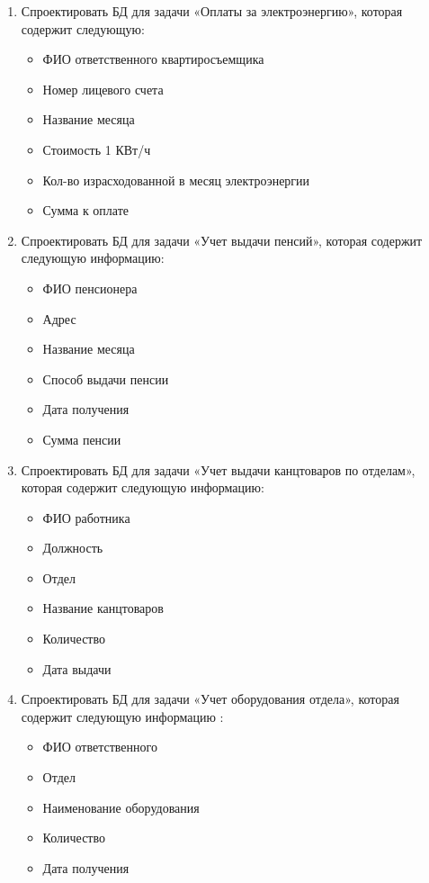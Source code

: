\documentclass[a4paper]{article}
\begin{document}
\begin{enumerate}
  \item Спроектировать БД для задачи «Оплаты за электроэнергию», которая содержит следующую:
    \begin{itemize}
      \item ФИО ответственного квартиросъемщика
      \item Номер лицевого счета
      \item Название месяца
      \item Стоимость 1 КВт/ч
      \item Кол-во израсходованной в месяц электроэнергии
      \item Сумма к оплате
    \end{itemize}


  \item Спроектировать БД для задачи «Учет выдачи пенсий», которая содержит следующую информацию:
    \begin{itemize}
        \item ФИО пенсионера
        \item Адрес
        \item Название месяца
        \item Способ выдачи пенсии
        \item Дата получения
        \item Сумма пенсии
    \end{itemize}

  \item Спроектировать БД для задачи «Учет выдачи канцтоваров по отделам», которая содержит следующую информацию:
    \begin{itemize}
        \item ФИО работника
        \item Должность
        \item Отдел
        \item Название канцтоваров
        \item Количество
        \item Дата выдачи
\end{itemize}

  \item Спроектировать БД для задачи «Учет оборудования отдела», которая содержит следующую информацию :
    \begin{itemize}
        \item ФИО ответственного
        \item Отдел
        \item Наименование оборудования
        \item Количество
        \item Дата получения
    \end{itemize}


\end{enumerate}
\end{document}
